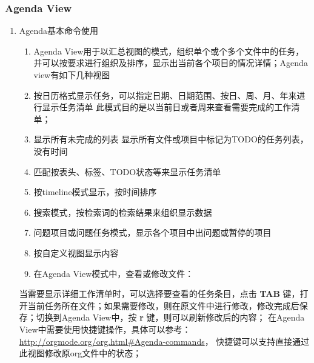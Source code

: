 \documentclass[10pt,a4paper]{article}
\begin{document}
\subsubsection{Agenda View}
\label{sec-2-2-4}
\begin{enumerate}
\item Agenda基本命令使用
\label{sec-2-2-4-1}
\begin{enumerate}
\item Agenda View用于以汇总视图的模式，组织单个或个多个文件中的任务，并可以按要求进行组织及排序，显示出当前各个项目的情况详情；Agenda view有如下几种视图
\item 按日历格式显示任务，可以指定日期、日期范围、按日、周、月、年来进行显示任务清单
此模式目的是以当前日或者周来查看需要完成的工作清单；
\item 显示所有未完成的列表
显示所有文件或项目中标记为TODO的任务列表，没有时间
\item 匹配按表头、标签、TODO状态等来显示任务清单
\item 按timeline模式显示，按时间排序
\item 搜索模式，按检索词的检索结果来组织显示数据
\item 问题项目或问题任务模式，显示各个项目中出问题或暂停的项目
\item 按自定义视图显示内容

\item 在Agenda View模式中，查看或修改文件：
\end{enumerate}
当需要显示详细工作清单时，可以选择要查看的任务条目，点击 \textbf{TAB} 键，打开当前任务所在文件；如果需要修改，则在原文件中进行修改，修改完成后保存；切换到Agenda View中，按 \textbf{r} 键，则可以刷新修改后的内容；
在Agenda View中需要使用快捷键操作，具体可以参考： \url{http://orgmode.org/org.html#Agenda-commands}， 快捷键可以支持直接通过此视图修改原org文件中的状态；


\end{enumerate}
\end{document}
